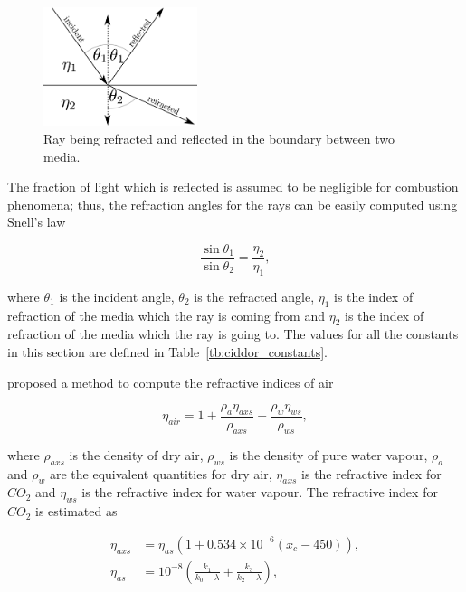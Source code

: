 \begin{figure}[htbp!]
	\centering
	\includegraphics[width=0.4\textwidth]{img/refraction_diag}
	\caption{Ray being refracted and reflected in the boundary between two media.}
	\label{fig:refraction_diag}
\end{figure}

The fraction of light which is reflected is assumed to be negligible for combustion phenomena; thus, the refraction angles for the rays can be easily computed using Snell's law

\begin{equation}
\frac{\sin \theta_1}{\sin \theta_2} = \frac{\eta_2}{\eta_1},
\end{equation}

where $\theta_1$ is the incident angle, $\theta_2$ is the refracted angle, $\eta_1$ is the index of refraction of the media which the ray is coming from and $\eta_2$ is the index of refraction of the media which the ray is going to.
The values for all the constants in this section are defined in Table~\ref{tb:ciddor_constants}.

\cite{Ciddor:1996} proposed a method to compute the refractive indices of air 

\begin{equation}
\label{eq:ciddor_eta_air}
\eta_{air} = 1 + \frac{\rho_a \eta_{axs}}{\rho_{axs}} + \frac{\rho_w \eta_{ws}}{\rho_{ws}},
\end{equation}

where $\rho_{axs}$ is the density of dry air, $\rho_{ws}$ is the density of pure water vapour, $\rho_{a}$ and $\rho_{w}$ are the equivalent quantities for dry air, $\eta_{axs}$ is the refractive index for $CO_2$ and $\eta_{ws}$ is the refractive index for water vapour.
The refractive index for $CO_2$ is estimated as

\begin{align}
\label{eq:ciddor_eta_axs}
\eta_{axs} &= \eta_{as} \left(1 + 0.534 \times 10^{-6} \left(x_c - 450 \right) \right), \\
\label{eq:ciddor_eta_as}
\eta_{as} &= 10^{-8} \left( \frac{k_1}{k_0 - \lambda} + \frac{k_3}{k_2 - \lambda} \right),
\end{align}

